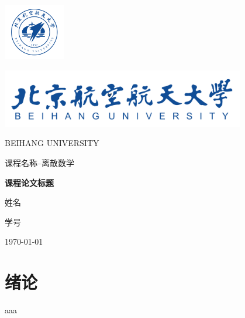 \documentclass[12pt,a4paper]{article}
\begin{document}
\begin{titlepage}
	\centering
	\includegraphics[width=0.2\textwidth]{sf1.png}\par
	\vspace{1cm}
	\includegraphics[width=0.8\textwidth]{sf.png}\par
	\vspace{0.1cm}
	{\scshape\LARGE BEIHANG UNIVERSITY \par}
	\vspace{1cm}
	{\kaishu\LARGE 课程名称--离散数学 \par}
	\vspace{1.5cm}
	{\Large\bfseries 课程论文标题 \par}
	\vspace{2cm}
	{\Large 姓名 \par}
	{\Large 学号 \par}
	\vfill

	\vfill
	{\large \today\par}
\end{titlepage}
\tableofcontents
\newpage

\section{绪论}
aaa
\end{document}
